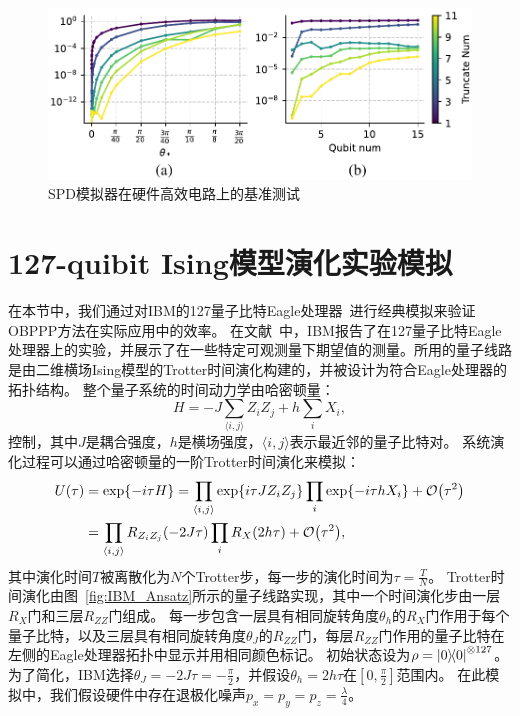 \begin{figure}[!ht]
    \centering
\includegraphics[width=\textwidth]{figures/SPD_benchmark.pdf}
    \caption{SPD模拟器在硬件高效电路上的基准测试}
\label{fig:bench_mini_AQC}
\end{figure}

\section{127-quibit Ising模型演化实验模拟}



在本节中，我们通过对IBM的127量子比特Eagle处理器~\cite{kim2023evidence}进行经典模拟来验证OBPPP方法在实际应用中的效率。
在文献~\cite{kim2023evidence}中，IBM报告了在127量子比特Eagle处理器上的实验，并展示了在一些特定可观测量下期望值的测量。所用的量子线路是由二维横场Ising模型的Trotter时间演化构建的，并被设计为符合Eagle处理器的拓扑结构。
整个量子系统的时间动力学由哈密顿量：
\begin{equation}
  H=-J\sum_{\langle i,j\rangle} Z_iZ_j+h\sum_i X_i,
\end{equation}
控制，其中$J$是耦合强度，$h$是横场强度，$\langle i,j\rangle$表示最近邻的量子比特对。
系统演化过程可以通过哈密顿量的一阶Trotter时间演化来模拟：
\begin{equation}
    \begin{aligned}
        U(\tau)&=\exp{-i\tau H}=\prod_{\langle i,j\rangle} \exp{i\tau J Z_iZ_j}\prod_i \exp{-i\tau h X_i}+\order{\tau^2}\\
        &=\prod_{\langle i,j\rangle}R_{Z_iZ_j}(-2J\tau) \prod_i R_X(2h\tau)+\order{\tau^2},
    \end{aligned}
\end{equation}
其中演化时间$T$被离散化为$N$个Trotter步，每一步的演化时间为$\tau = \frac{T}{N}$。
Trotter时间演化由图~\ref{fig:IBM_Ansatz}所示的量子线路实现，其中一个时间演化步由一层$R_X$门和三层$R_{ZZ}$门组成。
每一步包含一层具有相同旋转角度$\theta_h$的$R_X$门作用于每个量子比特，以及三层具有相同旋转角度$\theta_J$的$R_{ZZ}$门，每层$R_{ZZ}$门作用的量子比特在左侧的Eagle处理器拓扑中显示并用相同颜色标记。
初始状态设为$\rho=\ketbra{0}{0}^{\otimes 127}$。
为了简化，IBM选择$\theta_J=-2J\tau=-\frac{\pi}{2}$，并假设$\theta_h=2h\tau$在$[0,\frac{\pi}{2}]$范围内。
在此模拟中，我们假设硬件中存在退极化噪声$p_x = p_y = p_z = \frac{\lambda}{4}$。

